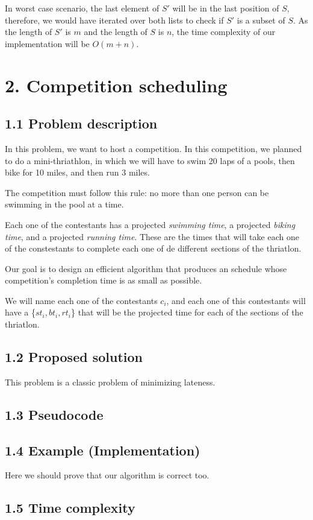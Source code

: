 \documentclass{article}
\begin{document}
In worst case scenario, the last element of $S'$ will be in the last position of $S$, therefore, we would have iterated over both lists to check if $S'$ is a subset of $S$. As the length of $S'$ is $m$ and the length of $S$ is $n$, the time complexity of our implementation will be $O(m+n)$.

\section*{2. Competition scheduling}

\subsection*{1.1 Problem description}

In this problem, we want to host a competition. In this competition, we planned to do a mini-thriathlon, in which we will have to swim 20 laps of a pools, then bike for 10 miles, and then run 3 miles.

The competition must follow this rule:  no more than one person can be swimming in the pool at a time.

Each one of the contestants has a projected \textit{swimming time}, a projected \textit{biking time}, and a projected \textit{running time}. These are the times that will take each one of the constestants to complete each one of de different sections of the thriatlon.

Our goal is to design an efficient algorithm that produces an schedule whose competition's completion time is as small as possible.

We will name each one of the contestants $c_i$, and each one of this contestants will have a \{$st_i,bt_i,rt_i$\} that will be the projected time for each of the sections of the thriatlon.

\subsection*{1.2 Proposed solution}

This problem is a classic problem of minimizing lateness.

\subsection*{1.3 Pseudocode}

\subsection*{1.4 Example (Implementation)}

Here we should prove that our algorithm is correct too.

\subsection*{1.5 Time complexity}
\end{document}
